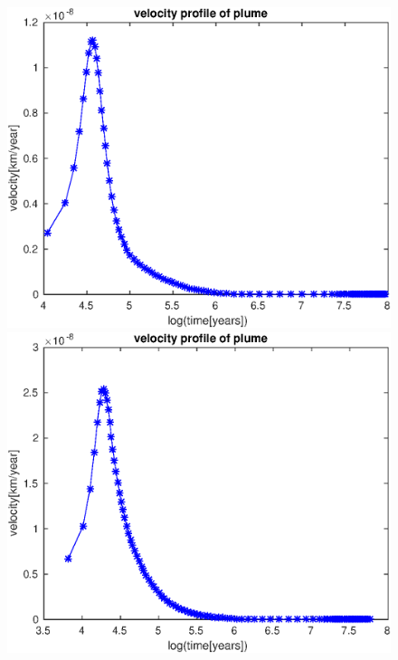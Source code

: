 \documentclass[12pt]{scrreprt}
\begin{document}
\begin{figure}[ht!]
	\begin{minipage}[t]{1.0\textwidth}
		\begin{minipage}[t]{0.5\textwidth}
		\includegraphics[width=1.0\textwidth]{./Snapshots/ref/Subductionzonewithblobposrefslab20s2e7s2e7r20velocity.eps}
		\end{minipage}
		\begin{minipage}[t]{0.5\textwidth}
		\includegraphics[width=1.0\textwidth]{./Snapshots/ref/Subductionzonewithblobposrefslab30s2e7s2e7r20velocity.eps}

\end{minipage}
\end{minipage}
\end{figure}
\end{document}
